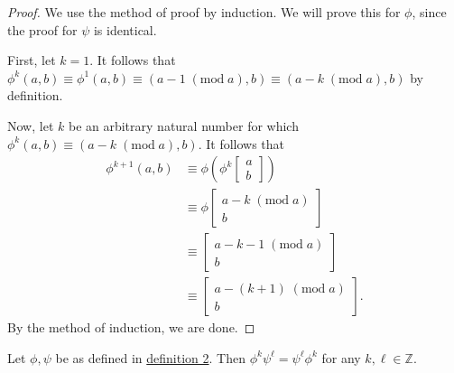 \documentclass[11pt, letterpaper]{article}
\renewcommand{\mod}[1]{\;(\text{mod}\;#1)}
\begin{document}
\begin{proof}
	We use the method of proof by induction. We will prove this for $\phi $, since the proof for $\psi $ is identical.

	First, let $k=1$. It follows that $\phi ^k(a,b)\equiv \phi ^1(a,b)\equiv (a-1\mod{a},b)\equiv (a-k\mod{a},b)$ by definition.

	Now, let $k$ be an arbitrary natural number for which $\phi ^k(a,b)\equiv (a-k\mod{a},b)$. It follows that
	\begin{align*}
		\phi ^{k+1}(a,b)&\equiv \phi \left( \phi ^k \begin{bmatrix} a \\ b \end{bmatrix} \right)\\
				&\equiv \phi \begin{bmatrix} a-k\mod{a} \\ b \end{bmatrix} \\
				&\equiv \begin{bmatrix} a-k-1\mod{a} \\ b \end{bmatrix} \\
				&\equiv \begin{bmatrix} a-(k+1)\mod{a} \\ b \end{bmatrix} 
	.\end{align*}
	By the method of induction, we are done.
\end{proof}
\begin{lemma}\label{lma:1}
	Let $\phi ,\psi $ be as defined in \hyperref[dfn:2]{definition 2}. Then $\phi ^k\psi ^\ell =\psi ^\ell \phi ^k$ for any $k,\ell \in\mathbb{Z}$.
\end{lemma}
\end{document}
